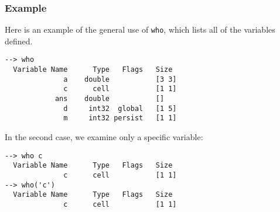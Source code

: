\subsubsection{Example}
Here is an example of the general use of \verb|who|, which lists all of the variables defined.
\begin{verbatim}
--> who
  Variable Name      Type   Flags   Size
              a    double           [3 3]
              c      cell           [1 1]
            ans    double           []
              d     int32  global   [1 5]
              m     int32 persist   [1 1]
\end{verbatim}
In the second case, we examine only a specific variable:
\begin{verbatim}
--> who c
  Variable Name      Type   Flags   Size
              c      cell           [1 1]
--> who('c')
  Variable Name      Type   Flags   Size
              c      cell           [1 1]
\end{verbatim}

